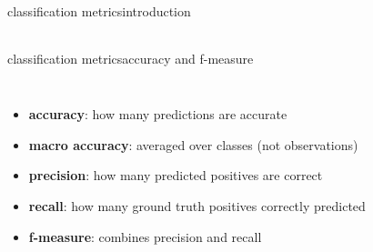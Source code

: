 \begin{frame}{classification metrics}{introduction}
\begin{table}
\begin{footnotesize}
\begin{center}
\begin{tabular}{@{}ll|cc|c@{}}
                \end{tabular}
                \end{center}
            \end{footnotesize}
            \end{table}
        \end{frame}
        
        \begin{frame}{classification metrics}{accuracy and f-measure}
            \begin{columns}
                    \begin{itemize}
                        \item<1-> \textbf{accuracy}: how many predictions are accurate
                        \item<2->   \textbf{macro accuracy}: averaged over classes (not observations)
                        \item<3->   \textbf{precision}: how many predicted positives are correct
                        \item<4->   \textbf{recall}: how many ground truth positives correctly predicted
                        \item<5->   \textbf{f-measure}: combines precision and recall
                    \end{itemize}
\end{columns}
\end{frame}
